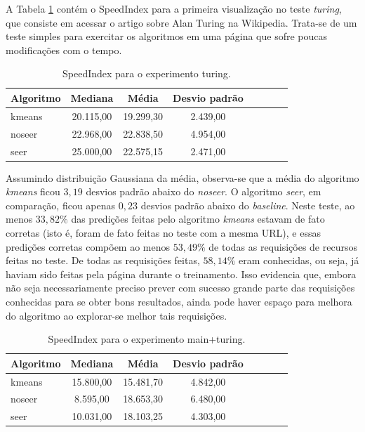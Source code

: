 \documentclass[10pt,twocolumn,letterpaper]{article}
\begin{document}
A Tabela \ref{tbl-turing} contém o SpeedIndex para a primeira visualização no teste \emph{turing}, que consiste em acessar o artigo sobre Alan Turing na Wikipedia. Trata-se de um teste simples para exercitar os algoritmos em uma página que sofre poucas modificações com o tempo.

\begin{table}
\begin{center}
\begin{tabular}{l*{6}{c}r}
\hline
Algoritmo & Mediana & Média & Desvio padrão \\
\hline
kmeans & 20.115,00 & 19.299,30  & 2.439,00 \\
noseer & 22.968,00 & 22.838,50 & 4.954,00 \\
seer & 25.000,00 & 22.575,15 & 2.471,00 \\
\hline
\end{tabular}
\end{center}
\caption{SpeedIndex para o experimento turing.}
\label{tbl-turing}
\end{table}

Assumindo distribuição Gaussiana da média, observa-se que a média do algoritmo \emph{kmeans} ficou $3,19$ desvios padrão abaixo do \emph{noseer}. O algoritmo \emph{seer}, em comparação, ficou apenas $0,23$ desvios padrão abaixo do \emph{baseline}. Neste teste, ao menos $33,82 \%$ das predições feitas pelo algoritmo \emph{kmeans} estavam de fato corretas (isto é, foram de fato feitas no teste com a mesma URL), e essas predições corretas compõem ao menos $53,49 \%$ de todas as requisições de recursos feitas no teste. De todas as requisições feitas, $58,14 \%$ eram conhecidas, ou seja, já haviam sido feitas pela página durante o treinamento. Isso evidencia que, embora não seja necessariamente preciso prever com sucesso grande parte das requisições conhecidas para se obter bons resultados, ainda pode haver espaço para melhora do algoritmo ao explorar-se melhor tais requisições.

\begin{table}
\begin{center}
\begin{tabular}{l*{6}{c}r}
\hline
Algoritmo & Mediana & Média & Desvio padrão \\
\hline
kmeans & 15.800,00 & 15.481,70 & 4.842,00 \\
noseer & 8.595,00 & 18.653,30 & 6.480,00 \\
seer & 10.031,00 & 18.103,25 & 4.303,00 \\
\hline
\end{tabular}
\end{center}
\caption{SpeedIndex para o experimento main+turing.}
\label{tbl-main-turing}
\end{table}
\end{document}
